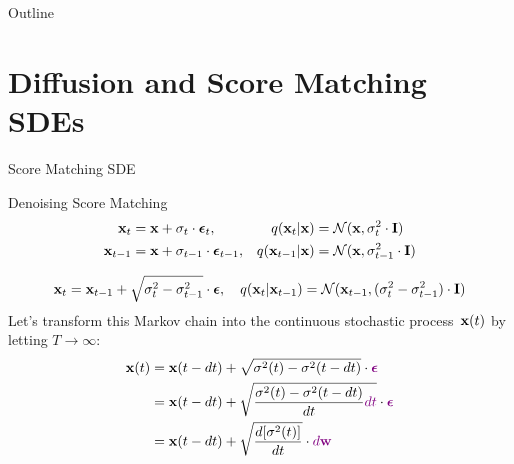 \documentclass{beamer}
\begin{document}
\begin{frame}{Outline}
	\tableofcontents
\end{frame}
\section{Diffusion and Score Matching SDEs}
\begin{frame}{Score Matching SDE}
	\vspace{-0.3cm}
	\begin{block}{Denoising Score Matching}
		\vspace{-0.7cm}
		\begin{align*}
			\mathbf{x}_t &= \mathbf{x} + \sigma_t \cdot \boldsymbol{\epsilon}_t, & q(\mathbf{x}_t | \mathbf{x}) &= \mathcal{N}(\mathbf{x}, \sigma_t^2 \cdot \mathbf{I}) \\
			\mathbf{x}_{t-1} &= \mathbf{x} + \sigma_{t-1} \cdot \boldsymbol{\epsilon}_{t-1}, & q(\mathbf{x}_{t-1} | \mathbf{x}) &= \mathcal{N}(\mathbf{x}, \sigma_{t-1}^2 \cdot \mathbf{I})
		\end{align*}
	\end{block}
	\vspace{-1.0cm}
	\[
		\mathbf{x}_t = \mathbf{x}_{t - 1} + \sqrt{\sigma^2_t - \sigma^2_{t-1}} \cdot \boldsymbol{\epsilon}, \quad q(\mathbf{x}_{t} | \mathbf{x}_{t-1}) = \mathcal{N}(\mathbf{x}_{t-1}, (\sigma_t^2 - \sigma_{t-1}^2) \cdot \mathbf{I})
	\]
	Let's transform this Markov chain into the continuous stochastic process~$\mathbf{x}(t)$ by letting $T \rightarrow \infty$:
	\vspace{-0.3cm}
	\begin{align*}
		\mathbf{x}(t) &= \mathbf{x}(t - dt) + \sqrt{\sigma^2(t) - \sigma^2(t - dt)} \cdot {\color{violet}\boldsymbol{\epsilon}} \\
		&= \mathbf{x}(t - dt) + \sqrt{\frac{\sigma^2(t) - \sigma^2(t - dt)}{dt} {\color{violet}dt}} \cdot {\color{violet}\boldsymbol{\epsilon}} \\
		&= \mathbf{x}(t - dt) + \sqrt{\frac{ d [\sigma^2(t)]}{dt}} \cdot {\color{violet}d \mathbf{w}}
	\end{align*}
	\vspace{-0.5cm}
\end{frame}
\end{document}
